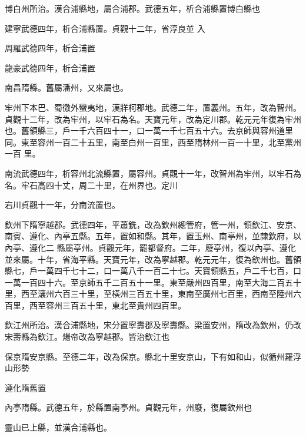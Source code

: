 \begin{pinyinscope}
 博白州所治。漢合浦縣地，屬合浦郡。武德五年，析合浦縣置博白縣也



 建寧武德四年，析合浦縣置。貞觀十二年，省淳良並
 入



 周羅武德四年，析合浦置



 龍豪武德四年，析合浦置



 南昌隋縣。舊屬潘州，又來屬也。



 牢州下本巴、蜀徼外蠻夷地，漢牂柯郡地。武德二年，置義州。五年，改為智州。貞觀十二年，改為牢州，以牢石為名。天寶元年，改為定川郡。乾元元年復為牢州也。舊領縣三，戶一千六百四十一，口一萬一千七百五十六。去京師與容州道里同。東至容州一百二十五里，南至白州一百里，西至隋林州一百一十里，北至黨州一百
 里。



 南流武德四年，析容州北流縣置，屬容州。貞觀十一年，改智州為牢州，以牢石為名。牢石高四十丈，周二十里，在州界也。定川



 宕川貞觀十一年，分南流置也。



 欽州下隋寧越郡。武德四年，平蕭銑，改為欽州總管府，管一州，領欽江、安京、南賓、遵化、內亭五縣。五年，置如和縣。其年，置玉州、南亭州，並隸欽府，以內亭、遵化二
 縣屬亭州。貞觀元年，罷都督府。二年，廢亭州，復以內亭、遵化並來屬。十年，省海平縣。天寶元年，改為寧越郡。乾元元年，復為欽州也。舊領縣七，戶一萬四千七十二，口一萬八千一百二十七。天寶領縣五，戶二千七百，口一萬一百四十六。至京師五千二百五十一里。東至嚴州四百里，南至大海二百五十里，西至瀼州六百三十里，至橫州三百五十里，東南至廣州七百里，西南至陸州六百里，西至容州三百五十里，東北至貴州四百里。



 欽江州所治。漢合浦縣地，宋分置寧壽郡及寧壽縣。梁置安州，隋改為欽州，仍改宋壽縣為欽江。煬帝改為寧越郡。皆治欽江也



 保京隋安京縣。至德二年，改為保京。縣北十里安京山，下有如和山，似循州羅浮山形勢



 遵化隋舊置



 內亭隋縣。武德五年，於縣置南亭州。貞觀元年，州廢，復屬欽州也



 靈山已上縣，並漢合浦縣也。




\end{pinyinscope}
